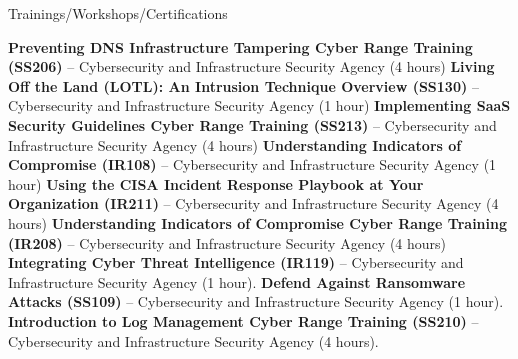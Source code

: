 \begin{rubric}{Trainings/Workshops/Certifications}

%
\entry*[07/24/2025] \textbf{Preventing DNS Infrastructure Tampering Cyber Range Training (SS206)} -- Cybersecurity and Infrastructure Security Agency (4 hours) \href{https://github.com/amantaya/curriculum-vitae/blob/master/certifications/SS206_Course_Completion_Certificate.pdf}{\scriptsize\faLink}
%
\entry*[7/22/2025] \textbf{Living Off the Land (LOTL): An Intrusion Technique Overview (SS130)} -- Cybersecurity and Infrastructure Security Agency (1 hour)
%
\entry*[7/17/2025] \textbf{Implementing SaaS Security Guidelines Cyber Range Training (SS213)} -- Cybersecurity and Infrastructure Security Agency (4 hours) \href{https://github.com/amantaya/curriculum-vitae/blob/master/certifications/SS213_Course_Completion_Certificate.pdf}{\scriptsize\faLink}
%
\entry*[7/03/2025] \textbf{Understanding Indicators of Compromise (IR108)} -- Cybersecurity and Infrastructure Security Agency (1 hour) \href{https://github.com/amantaya/curriculum-vitae/blob/master/certifications/IR108_JUL2-2025_CertificateofAttendance.pdf}{\scriptsize\faLink}
%
\entry*[6/24/2025] \textbf{Using the CISA Incident Response Playbook at Your Organization (IR211)} -- Cybersecurity and Infrastructure Security Agency (4 hours) \href{https://github.com/amantaya/curriculum-vitae/blob/master/certifications/IR211_JUN24-2025_CertificateofAttendance.pdf}{\scriptsize\faLink}
%
\entry*[6/10/2025] \textbf{Understanding Indicators of Compromise Cyber Range Training (IR208)} -- Cybersecurity and Infrastructure Security Agency (4 hours) \href{https://github.com/amantaya/curriculum-vitae/blob/master/certifications/IR208_June10_2025_Course_Completion_Certificate.pdf}{\scriptsize\faLink}
%
\entry*[6/09/2025] \textbf{Integrating Cyber Threat Intelligence (IR119)} -- Cybersecurity and Infrastructure Security Agency (1 hour). \href{https://github.com/amantaya/curriculum-vitae/blob/master/certifications/IR119_CoC_060925%201.pdf}{\scriptsize\faLink}
%
\entry*[5/28/2025] \textbf{Defend Against Ransomware Attacks (SS109)} -- Cybersecurity and Infrastructure Security Agency (1 hour). \href{https://github.com/amantaya/curriculum-vitae/blob/master/certifications/SS109_MAY28-2025_CertificateofAttendance.pdf}{\scriptsize\faLink}
%
\entry*[5/22/2025] \textbf{Introduction to Log Management Cyber Range Training (SS210)} -- Cybersecurity and Infrastructure Security Agency (4 hours). \href{https://github.com/amantaya/curriculum-vitae/blob/master/certifications/SS210_May22_2025_Course_Completion_Certificate.pdf}{\scriptsize\faLink}

\end{rubric}
